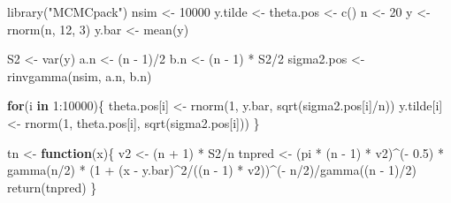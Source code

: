 \documentclass[
  10pt,
  spanish,
]{book}
\newenvironment{Shaded}{\begin{snugshade}}{\end{snugshade}}
\newcommand{\ControlFlowTok}[1]{\textcolor[rgb]{0.13,0.29,0.53}{\textbf{#1}}}
\newcommand{\DecValTok}[1]{\textcolor[rgb]{0.00,0.00,0.81}{#1}}
\newcommand{\FloatTok}[1]{\textcolor[rgb]{0.00,0.00,0.81}{#1}}
\newcommand{\FunctionTok}[1]{\textcolor[rgb]{0.00,0.00,0.00}{#1}}
\newcommand{\NormalTok}[1]{#1}
\newcommand{\OtherTok}[1]{\textcolor[rgb]{0.56,0.35,0.01}{#1}}
\newcommand{\SpecialCharTok}[1]{\textcolor[rgb]{0.00,0.00,0.00}{#1}}
\newcommand{\StringTok}[1]{\textcolor[rgb]{0.31,0.60,0.02}{#1}}
\theoremstyle{definition}
\theoremstyle{definition}
\theoremstyle{definition}
\theoremstyle{definition}
\theoremstyle{remark}
\begin{document}
\begin{Shaded}
\begin{Highlighting}[]
\FunctionTok{library}\NormalTok{(}\StringTok{"MCMCpack"}\NormalTok{)}
\NormalTok{nsim }\OtherTok{\textless{}{-}} \DecValTok{10000}
\NormalTok{y.tilde }\OtherTok{\textless{}{-}}\NormalTok{ theta.pos }\OtherTok{\textless{}{-}} \FunctionTok{c}\NormalTok{()}
\NormalTok{n }\OtherTok{\textless{}{-}} \DecValTok{20}
\NormalTok{y }\OtherTok{\textless{}{-}} \FunctionTok{rnorm}\NormalTok{(n, }\DecValTok{12}\NormalTok{, }\DecValTok{3}\NormalTok{)}
\NormalTok{y.bar }\OtherTok{\textless{}{-}} \FunctionTok{mean}\NormalTok{(y)}

\NormalTok{S2 }\OtherTok{\textless{}{-}} \FunctionTok{var}\NormalTok{(y)}
\NormalTok{a.n }\OtherTok{\textless{}{-}}\NormalTok{ (n }\SpecialCharTok{{-}} \DecValTok{1}\NormalTok{)}\SpecialCharTok{/}\DecValTok{2}
\NormalTok{b.n }\OtherTok{\textless{}{-}}\NormalTok{ (n }\SpecialCharTok{{-}} \DecValTok{1}\NormalTok{) }\SpecialCharTok{*}\NormalTok{ S2}\SpecialCharTok{/}\DecValTok{2}
\NormalTok{sigma2.pos }\OtherTok{\textless{}{-}} \FunctionTok{rinvgamma}\NormalTok{(nsim, a.n, b.n)}

\ControlFlowTok{for}\NormalTok{(i }\ControlFlowTok{in} \DecValTok{1}\SpecialCharTok{:}\DecValTok{10000}\NormalTok{)\{}
\NormalTok{    theta.pos[i] }\OtherTok{\textless{}{-}} \FunctionTok{rnorm}\NormalTok{(}\DecValTok{1}\NormalTok{, y.bar, }\FunctionTok{sqrt}\NormalTok{(sigma2.pos[i]}\SpecialCharTok{/}\NormalTok{n))}
\NormalTok{    y.tilde[i] }\OtherTok{\textless{}{-}} \FunctionTok{rnorm}\NormalTok{(}\DecValTok{1}\NormalTok{, theta.pos[i], }\FunctionTok{sqrt}\NormalTok{(sigma2.pos[i]))}
\NormalTok{\}}

\NormalTok{tn }\OtherTok{\textless{}{-}} \ControlFlowTok{function}\NormalTok{(x)\{}
\NormalTok{    v2 }\OtherTok{\textless{}{-}}\NormalTok{ (n }\SpecialCharTok{+} \DecValTok{1}\NormalTok{) }\SpecialCharTok{*}\NormalTok{ S2}\SpecialCharTok{/}\NormalTok{n}
\NormalTok{    tnpred }\OtherTok{\textless{}{-}}\NormalTok{ (pi }\SpecialCharTok{*}\NormalTok{ (n }\SpecialCharTok{{-}} \DecValTok{1}\NormalTok{) }\SpecialCharTok{*}\NormalTok{ v2)}\SpecialCharTok{\^{}}\NormalTok{(}\SpecialCharTok{{-}} \FloatTok{0.5}\NormalTok{) }\SpecialCharTok{*} \FunctionTok{gamma}\NormalTok{(n}\SpecialCharTok{/}\DecValTok{2}\NormalTok{) }\SpecialCharTok{*} 
\NormalTok{      (}\DecValTok{1} \SpecialCharTok{+}\NormalTok{ (x }\SpecialCharTok{{-}}\NormalTok{ y.bar)}\SpecialCharTok{\^{}}\DecValTok{2}\SpecialCharTok{/}\NormalTok{((n }\SpecialCharTok{{-}} \DecValTok{1}\NormalTok{) }\SpecialCharTok{*}\NormalTok{ v2))}\SpecialCharTok{\^{}}\NormalTok{(}\SpecialCharTok{{-}}\NormalTok{ n}\SpecialCharTok{/}\DecValTok{2}\NormalTok{)}\SpecialCharTok{/}\FunctionTok{gamma}\NormalTok{((n }\SpecialCharTok{{-}} \DecValTok{1}\NormalTok{)}\SpecialCharTok{/}\DecValTok{2}\NormalTok{)}
    \FunctionTok{return}\NormalTok{(tnpred)}
\NormalTok{\}}


\end{Highlighting}
\end{Shaded}
\end{document}
